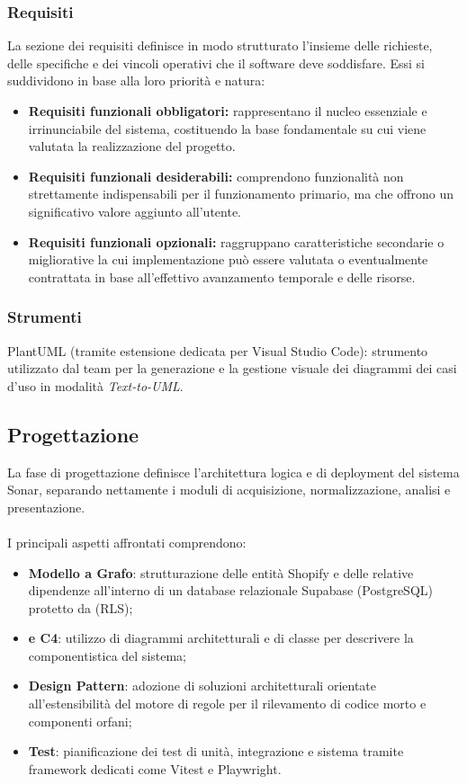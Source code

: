 \subsubsection{Requisiti}
La sezione dei requisiti definisce in modo strutturato l'insieme delle richieste, delle specifiche e dei vincoli operativi che il software deve soddisfare. Essi si suddividono in base alla loro priorità e natura:
\begin{itemize}
    \item \textbf{Requisiti funzionali obbligatori:} rappresentano il nucleo essenziale e irrinunciabile del sistema, costituendo la base fondamentale su cui viene valutata la realizzazione del progetto.
    \item \textbf{Requisiti funzionali desiderabili:} comprendono funzionalità non strettamente indispensabili per il funzionamento primario, ma che offrono un significativo valore aggiunto all'utente.
    \item \textbf{Requisiti funzionali opzionali:} raggruppano caratteristiche secondarie o migliorative la cui implementazione può essere valutata o eventualmente contrattata in base all'effettivo avanzamento temporale e delle risorse.
\end{itemize}

\subsubsection{Strumenti}
PlantUML (tramite estensione dedicata per Visual Studio Code): strumento utilizzato dal team per la generazione e la gestione visuale dei diagrammi dei casi d'uso in modalità \emph{Text-to-UML}.

\subsection{Progettazione}
La fase di progettazione definisce l'architettura logica e di deployment del sistema Sonar, separando nettamente i moduli di acquisizione, normalizzazione, analisi e presentazione. \\
\\
I principali aspetti affrontati comprendono:
\begin{itemize}
    \item \textbf{Modello a Grafo}: strutturazione delle entità Shopify e delle relative dipendenze all'interno di un database relazionale Supabase (PostgreSQL) protetto da  (RLS);
    \item \textbf{ e C4}: utilizzo di diagrammi architetturali e di classe per descrivere la componentistica del sistema;
    \item \textbf{Design Pattern}: adozione di soluzioni architetturali orientate all'estensibilità del motore di regole per il rilevamento di codice morto e componenti orfani;
    \item \textbf{Test}: pianificazione dei test di unità, integrazione e sistema tramite framework dedicati come Vitest e Playwright.
\end{itemize}

